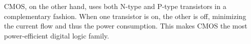 CMOS, on the other hand, uses both N-type and P-type transistors in a complementary fashion. When one transistor is on, the other is off, minimizing the current flow and thus the power consumption. This makes CMOS the most power-efficient digital logic family.

